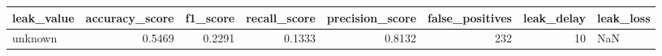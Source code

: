 \begin{tabular}{lrrrrrrl}
\toprule
leak\_value & accuracy\_score & f1\_score & recall\_score & precision\_score & false\_positives & leak\_delay & leak\_loss \\
\midrule
unknown & 0.5469 & 0.2291 & 0.1333 & 0.8132 & 232 & 10 & NaN \\
\bottomrule
\end{tabular}
